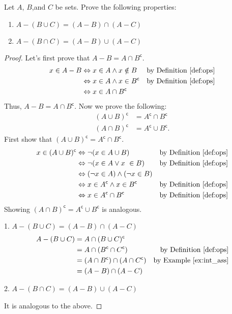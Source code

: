 \documentclass[../main.tex]{subfiles}
\begin{document}
\begin{ex}
    Let $A$, $B$,and $C$ be sets.
    Prove the following properties:
    \begin{enumerate}
        \item $A - (B \cup C) = (A - B) \cap (A - C)$
        \item $A - (B \cap C) = (A - B) \cup (A - C)$
    \end{enumerate}
\end{ex}
\begin{proof}
    Let's first prove that $A - B = A \cap B^\mathsf{c}$.
    \begin{align*}
        x \in A - B &\Leftrightarrow x \in A \wedge x \notin B &\text{by Definition~\ref{def:ops}}\\
                    &\Leftrightarrow x \in A \wedge x \in B^\mathsf{c} &\text{by Definition~\ref{def:ops}}\\
                    &\Leftrightarrow x \in A \cap B^\mathsf{c}
    \end{align*}
    Thus, $A - B = A \cap B^\mathsf{c}$. Now we prove the following:
    \begin{align*}
        (A \cup B)^\mathsf{c} &= A^\mathsf{c} \cap B^\mathsf{c}\\
        (A \cap B)^\mathsf{c} &= A^\mathsf{c} \cup B^\mathsf{c}.
    \end{align*}
    First show that $(A \cup B)^\mathsf{c} = A^\mathsf{c} \cap B^\mathsf{c}$.
    \begin{align*}
        x \in (A \cup B)^\mathsf{c} &\Leftrightarrow \neg (x \in A \cup B) &\text{by Definition~\ref{def:ops}}\\
                                    &\Leftrightarrow \neg (x \in A \vee x \
    \in B) &\text{by Definition~\ref{def:ops}}\\
           &\Leftrightarrow (\neg x \in A) \wedge (\neg x \in B)\\
           &\Leftrightarrow x \in A^\mathsf{c} \wedge x \in B^\mathsf{c} &\text{by Definition~\ref{def:ops}}\\
           &\Leftrightarrow x \in A^\mathsf{c} \cap B^\mathsf{c} &\text{by Definition~\ref{def:ops}}
    \end{align*}
    Showing $(A \cap B)^\mathsf{c} = A^\mathsf{c} \cup B^\mathsf{c}$ is analogous.

    1. $A - (B \cup C) = (A - B) \cap (A - C)$
    \begin{align*}
        A - (B \cup C) &= A \cap (B \cup C)^\mathsf{c}\\
                       &= A \cap (B^\mathsf{c} \cap C^\mathsf{c}) &\text{by Definition~\ref{def:ops}}\\
                       &= (A \cap B^\mathsf{c}) \cap (A \cap C^\mathsf{c}) &\text{by Example~\ref{ex:int_ass}}\\
                       &= (A - B) \cap (A - C)
    \end{align*}

    2. $A - (B \cap C) = (A - B) \cup (A - C)$

    It is analogous to the above.
\end{proof}
\end{document}
